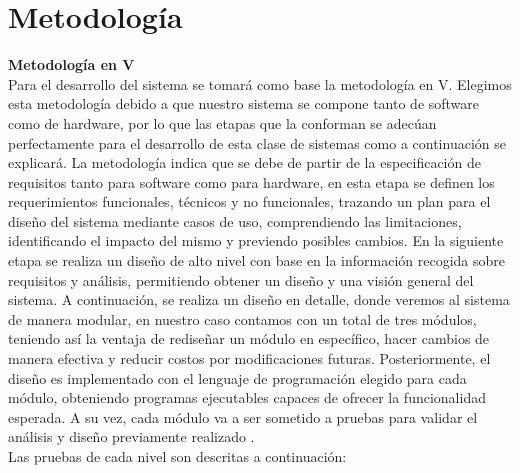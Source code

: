 \section{Metodología}

\textbf{Metodología en V}\\
Para el desarrollo del sistema se tomará como base la metodología en V. 
Elegimos esta metodología debido a que nuestro sistema se compone tanto de software como de hardware, por lo que las etapas que la conforman se adecúan perfectamente para el desarrollo de esta clase de sistemas como a continuación se explicará. 
La metodología indica que se debe de partir de la especificación de requisitos tanto para software como para hardware, en esta etapa se definen los requerimientos funcionales, técnicos y no funcionales, trazando un plan para el diseño del sistema mediante casos de uso, comprendiendo las limitaciones, identificando el impacto del mismo y previendo posibles cambios. En la siguiente etapa se realiza un diseño de alto nivel con base en la información recogida sobre requisitos y análisis, permitiendo obtener un diseño y una visión general del sistema. 
A continuación, se realiza un diseño en detalle, donde veremos al sistema de manera modular, en nuestro caso contamos con un total de tres módulos, teniendo así la ventaja de rediseñar un módulo en específico, hacer cambios de manera efectiva y reducir costos por modificaciones futuras. Posteriormente, el diseño es implementado con el lenguaje de programación elegido para cada módulo, obteniendo programas ejecutables capaces de ofrecer la funcionalidad esperada. A su vez, cada módulo va a ser sometido a pruebas para validar el análisis y diseño previamente realizado \citep{Metodologia1}.
\\
Las pruebas de cada nivel son descritas a continuación:


